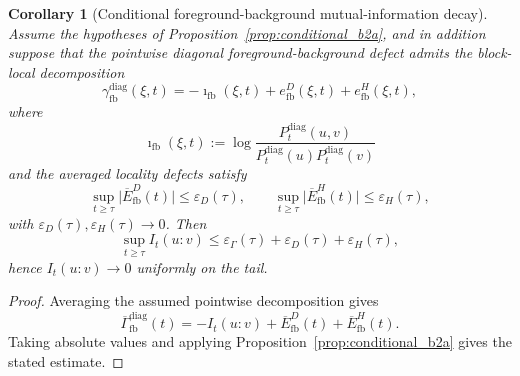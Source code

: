 \documentclass[12pt]{article}
\newtheorem{corollary}[theorem]{Corollary}
\theoremstyle{definition}
\theoremstyle{remark}
\begin{document}
\begin{corollary}[Conditional foreground-background mutual-information decay]\label{cor:conditional_b2b}
Assume the hypotheses of Proposition~\ref{prop:conditional_b2a}, and in
addition suppose that the pointwise diagonal foreground-background defect
admits the block-local decomposition
\[
\gamma_{\mathrm{fb}}^{\mathrm{diag}}(\xi,t)
=
-\imath_{\mathrm{fb}}(\xi,t)
+
e_{\mathrm{fb}}^D(\xi,t)
+
e_{\mathrm{fb}}^H(\xi,t),
\]
where
\[
\imath_{\mathrm{fb}}(\xi,t)
:=
\log\frac{P_t^{\mathrm{diag}}(u,v)}
{P_t^{\mathrm{diag}}(u)P_t^{\mathrm{diag}}(v)}
\]
and the averaged locality defects satisfy
\[
\sup_{t\ge\tau}
\bigl|
\overline{E}_{\mathrm{fb}}^D(t)
\bigr|
\le
\varepsilon_D(\tau),
\qquad
\sup_{t\ge\tau}
\bigl|
\overline{E}_{\mathrm{fb}}^H(t)
\bigr|
\le
\varepsilon_H(\tau),
\]
with \(\varepsilon_D(\tau),\varepsilon_H(\tau)\to 0\). Then
\[
\sup_{t\ge\tau}
I_t(u:v)
\le
\varepsilon_\Gamma(\tau)
+
\varepsilon_D(\tau)
+
\varepsilon_H(\tau),
\]
hence \(I_t(u:v)\to 0\) uniformly on the tail.
\end{corollary}

\begin{proof}
Averaging the assumed pointwise decomposition gives
\[
\overline{\Gamma}_{\mathrm{fb}}^{\mathrm{diag}}(t)
=
-I_t(u:v)
+
\overline{E}_{\mathrm{fb}}^D(t)
+
\overline{E}_{\mathrm{fb}}^H(t).
\]
Taking absolute values and applying
Proposition~\ref{prop:conditional_b2a} gives the stated estimate.
\end{proof}
\end{document}
